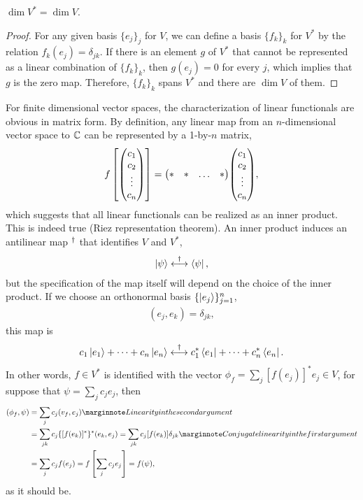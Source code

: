 \begin{lemma}
	$\dim V^* = \dim V$.
\end{lemma}
\begin{proof}	
	For any given basis $\{e_j\}_j$ for $V$, we can define a basis $\{f_k\}_k$ for $V^*$ by the relation $f_k(e_j) = \delta_{jk}$. If there is an element $g$ of $V^*$ that cannot be represented as a linear combination of $\{f_k\}_k$, then $g(e_j) = 0$ for every $j$, which implies that $g$ is the zero map. Therefore, $\{f_k\}_k$ spans $V^*$ and there are $\dim V$ of them.
\end{proof}
For finite dimensional vector spaces, the characterization of linear functionals are obvious in matrix form. By definition, any linear map from an $n$-dimensional vector space to $\mathbb C$ can be represented by a 1-by-$n$ matrix, 
\begin{align}
	f\left[\mqty(c_1\\c_2\\ \vdots \\ c_n)\right] = \mqty(* & * &\dots & *) \mqty(c_1\\c_2\\ \vdots \\ c_n),
\end{align}
which suggests that all linear functionals can be realized as an inner product. 
This is indeed true (Riez representation theorem). An inner product induces an antilinear map $^{\dagger}$ that identifies $V$ and $V^*$,
\begin{align}
	\ket{\psi} \overset{\dagger}{\longleftrightarrow} \bra{\psi}, 
\end{align}
but the specification of the map itself will depend on the choice of the inner product. If we choose an orthonormal basis $\{\ket{e_j}\}_{j=1}^n$,
\begin{align}
	(e_j,e_k) = \delta_{jk},
\end{align} 
this map is
\begin{align}
	c_1 \ket{e_1} + \dots + c_n\ket{e_n} \overset{\dagger}{\longleftrightarrow} 
		c_1^* \bra{e_1} + \dots + c_n^*\bra{e_n}.
\end{align}
In other words, $f \in V^*$ is identified with the vector $\phi_f = \sum_j[f(e_j)]^* e_j \in V$, for suppose that $\psi = \sum_j c_j e_j$, then
\begin{align}
	(\phi_f,\psi) &= \sum_j c_j (v_f,e_j) \mnf{Linearity in the second argument} \\
	&= \sum_{jk} c_j  \{[f(e_k)]^*\}^* (e_k,e_j) = \sum_{jk} c_j  [f(e_k)] \delta_{jk} \mnf{Conjugate linearity in the first argument} \\
	&= \sum_j c_j f(e_j) = f\left[\sum_j c_j e_j\right] = f(\psi),
\end{align}
as it should be.



